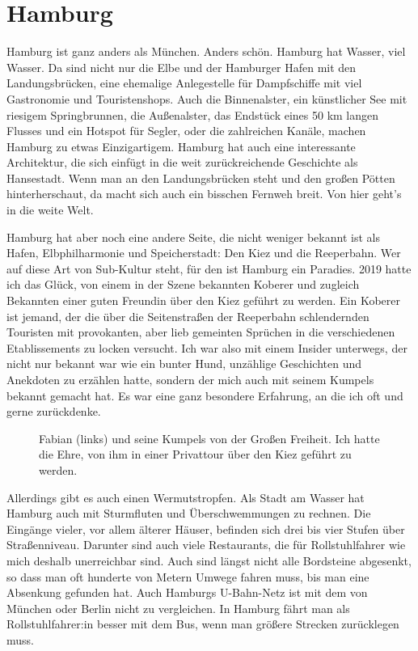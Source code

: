 \documentclass[fontsize=14pt,a4paper,headinclude,DIV=calc,automark]{scrbook}
\begin{document}
\section{Hamburg}

Hamburg ist ganz anders als München. Anders schön. Hamburg hat Wasser, viel Wasser. Da sind nicht nur die Elbe und der Hamburger Hafen mit den Landungsbrücken, eine ehemalige Anlegestelle für Dampfschiffe mit viel Gastronomie und Touristenshops. Auch die Binnenalster, ein künstlicher See mit riesigem Springbrunnen, die Außenalster, das Endstück eines 50 km langen Flusses und ein Hotspot für Segler, oder die zahlreichen Kanäle, machen Hamburg zu etwas Einzigartigem. Hamburg hat auch eine interessante Architektur, die sich einfügt in die weit zurückreichende Geschichte als Hansestadt. Wenn man an den Landungsbrücken steht und den großen Pötten hinterherschaut, da macht sich auch ein bisschen Fernweh breit. Von hier geht’s in die weite Welt.

Hamburg hat aber noch eine andere Seite, die nicht weniger bekannt ist als Hafen, Elbphilharmonie und Speicherstadt: Den Kiez und die Reeperbahn. Wer auf diese Art von Sub-Kultur steht, für den ist Hamburg ein Paradies. 2019 hatte ich das Glück, von einem in der Szene bekannten Koberer und zugleich Bekannten einer guten Freundin über den Kiez geführt zu werden. Ein Koberer ist jemand, der die über die Seitenstraßen der Reeperbahn schlendernden Touristen mit provokanten, aber lieb gemeinten Sprüchen in die verschiedenen Etablissements zu locken versucht. Ich war also mit einem Insider unterwegs, der nicht nur bekannt war wie ein bunter Hund, unzählige Geschichten und Anekdoten zu erzählen hatte, sondern der mich auch mit seinem Kumpels bekannt gemacht hat. Es war eine ganz besondere Erfahrung, an die ich oft und gerne zurückdenke.

\setlength{\fboxsep}{0pt}    %
\setlength{\fboxrule}{0.2pt} %
\begin{figure}[ht]
    \raggedright
    \caption{Fabian (links) und seine Kumpels von der Großen Freiheit. Ich hatte die Ehre, von ihm in einer Privattour über den Kiez geführt zu werden.}
    \label{fig:hamburg}
\end{figure}

Allerdings gibt es auch einen Wermutstropfen. Als Stadt am Wasser hat Hamburg auch mit Sturmfluten und Überschwemmungen zu rechnen. Die Eingänge vieler, vor allem älterer Häuser, befinden sich drei bis vier Stufen über Straßenniveau. Darunter sind auch viele Restaurants, die für Rollstuhlfahrer wie mich deshalb unerreichbar sind. Auch sind längst nicht alle Bordsteine abgesenkt, so dass man oft hunderte von Metern Umwege fahren muss, bis man eine Absenkung gefunden hat. Auch Hamburgs U-Bahn-Netz ist mit dem von München oder Berlin nicht zu vergleichen. In Hamburg fährt man als Rollstuhlfahrer:in besser mit dem Bus, wenn man größere Strecken zurücklegen muss.
\end{document}
